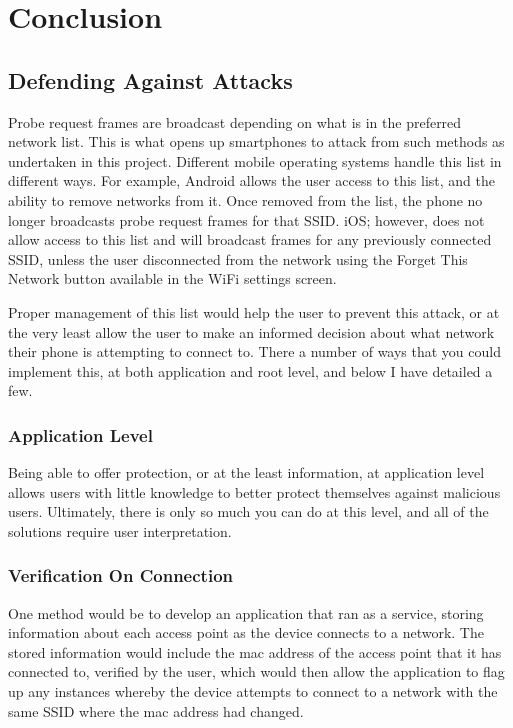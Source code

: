 \section{Conclusion}
\subsection{Defending Against Attacks}
Probe request frames are broadcast depending on what is in the preferred network list. This is what opens up smartphones to attack from such methods as undertaken in this project. Different mobile operating systems handle this list in different ways. For example, Android allows the user access to this list, and the ability to remove networks from it. Once removed from the list, the phone no longer broadcasts probe request frames for that SSID. iOS; however, does not allow access to this list and will broadcast frames for any previously connected SSID, unless the user disconnected from the network using the Forget This Network button available in the WiFi settings screen.

Proper management of this list would help the user to prevent this attack, or at the very least allow the user to make an informed decision about what network their phone is attempting to connect to. There a number of ways that you could implement this, at both application and root level, and below I have detailed a few.

\subsubsection{Application Level}
Being able to offer protection, or at the least information, at application level allows users with little knowledge to better protect themselves against malicious users. Ultimately, there is only so much you can do at this level, and all of the solutions require user interpretation.

\subsubsection*{Verification On Connection}
One method would be to develop an application that ran as a service, storing information about each access point as the device connects to a network. The stored information would include the mac address of the access point that it has connected to, verified by the user, which would then allow the application to flag up any instances whereby the  device attempts to connect to a network with the same SSID where the mac address had changed.


